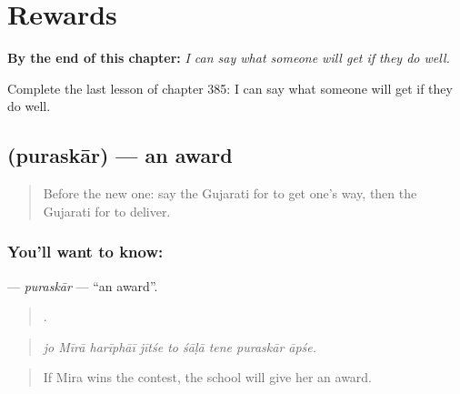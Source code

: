 
\chapter{Rewards}
\label{ch:gu-rewards}

\begin{chapteropening}
\textbf{By the end of this chapter:} \emph{I can say what someone will get if they do well.}

Complete the last lesson of chapter 385: I can say what someone will get if they do well.
\end{chapteropening}

\section[\texorpdfstring{\gu{પુરસ્કાર} (puraskār)}{પુરસ્કાર (puraskār)}]{ (puraskār) — an award}

\label{lesson:GU-C385-puraskar}



\begin{quote}
Before the new one: say the Gujarati for to get one's way, then the Gujarati for to deliver.
\end{quote}

\subsection*{You'll want to know: }
\textbf{} — \emph{puraskār} — \textquotedblleft{}an award\textquotedblright{}.

\begin{quote}
        .
\end{quote}

\begin{quote}
\emph{jo Mīrā harīphāī jītśe to śāḷā tene puraskār āpśe.}
\end{quote}

\begin{quote}
If Mira wins the contest, the school will give her an award.
\end{quote}

